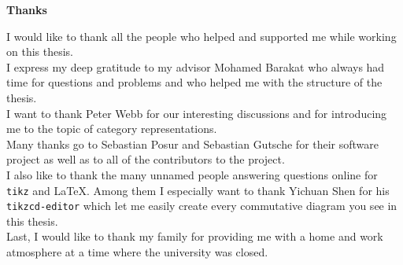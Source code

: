\begin{center}
\begin{Large}
\textbf{Thanks}
\end{Large}
\end{center}
\vspace{5cm}
I would like to thank all the people who helped and supported me while working on this thesis.\\

I express my deep gratitude to my advisor Mohamed Barakat  who always had time for questions and problems and who helped me
with the structure of the thesis.\\

I want to thank Peter Webb for our interesting discussions and for introducing me to the topic of category representations.\\

Many thanks go to Sebastian Posur and Sebastian Gutsche for their software project \CAP as well as to all of the contributors to the \CAP project.\\

I also like to thank the many unnamed people answering questions online for \texttt{tikz} and \LaTeX. Among them I especially want to thank
Yichuan Shen for his \texttt{tikzcd-editor} which let me easily create every commutative diagram you see in this thesis.\\

Last, I would like to thank my family for providing me with a home and work atmosphere at a time where the university was closed.\\
